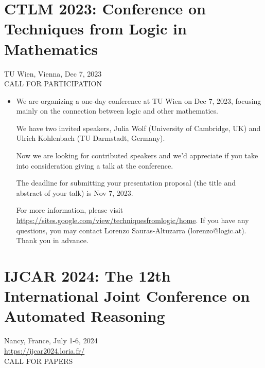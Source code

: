 \documentclass[prodmode,acmtecs]{acmsmall} %
\begin{document}
\section{CTLM 2023: Conference on Techniques from Logic in Mathematics }\label{CTLM2023}  TU Wien, Vienna, Dec 7, 2023\\ 
CALL FOR PARTICIPATION 

\begin{itemize}\item  We are organizing a one-day conference at TU Wien on Dec 7, 2023, focusing mainly on the connection between logic and other mathematics. 
 
  We have two invited speakers, Julia Wolf (University of Cambridge, UK) and Ulrich Kohlenbach (TU Darmstadt, Germany). 
 
  Now we are looking for contributed speakers and we'd appreciate if you take into consideration giving a talk at the conference. 
 
  The deadline for submitting your presentation proposal (the title and abstract of your talk) is Nov 7, 2023. 
 
  For more information, please visit \href{https://sites.google.com/view/techniquesfromlogic/home}{https://sites.google.com/view/techniquesfromlogic/home}. If you have any questions, you may contact Lorenzo Sauras-Altuzarra (lorenzo@logic.at). Thank you in advance. 
 
\end{itemize}\section{IJCAR 2024: The 12th International Joint Conference on Automated Reasoning}\label{IJCAR2024}  Nancy, France, July 1-6, 2024\\ 
  \href{https://ijcar2024.loria.fr/}{https://ijcar2024.loria.fr/}\\ 
CALL FOR PAPERS 
\end{document}
